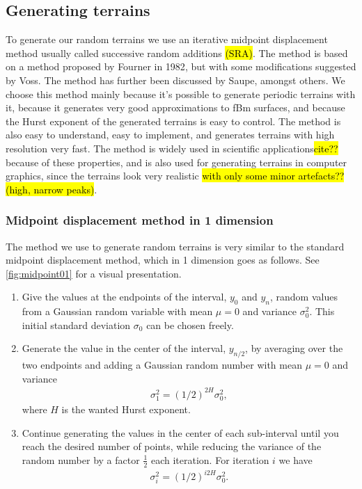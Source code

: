 \subsection{Generating terrains}

To generate our random terrains we use an iterative midpoint displacement method usually called successive random additions \hl{(SRA)}. The method is based on a method proposed by Fourner in 1982\cite{fournier1982computer}, but with some modifications suggested by Voss\cite{voss1985random, voss1988fractals}. The method has further been discussed by Saupe\cite{saupe1988algorithms}, amongst others. We choose this method mainly because it's possible to generate periodic terrains with it, because it generates very good approximations to fBm surfaces\cite{zhou2005comparison}, and because the Hurst exponent of the generated terrains is easy to control. The method is also easy to understand, easy to implement, and generates terrains with high resolution very fast. The method is widely used in scientific applications\hl{cite??} because of these properties, and is also used for generating terrains in computer graphics, since the terrains look very realistic \hl{with only some minor artefacts?? (high, narrow peaks)}.

\subsubsection{Midpoint displacement method in 1 dimension}
The method we use to generate random terrains is very similar to the standard midpoint displacement method, which in 1 dimension goes as follows. See \cref{fig:midpoint01} for a visual presentation.
\begin{enumerate}
    \item Give the values at the endpoints of the interval, $y_0$ and $y_n$, random values from a Gaussian random variable with mean $\mu = 0$ and variance $\sigma_0^2$. This initial standard deviation $\sigma_0$ can be chosen freely.
    \item Generate the value in the center of the interval, $y_{n/2}$, by averaging over the two endpoints and adding a Gaussian random number with mean $\mu = 0$ and variance
    \begin{align*}
         \sigma_1^2 = \left(1/2\right)^{2H}\sigma_0^2,
    \end{align*}
    where $H$ is the wanted Hurst exponent.
    \item Continue generating the values in the center of each sub-interval until you reach the desired number of points, while reducing the variance of the random number by a factor $\frac{1}{2}$ each iteration. For iteration $i$ we have
    \begin{align*}
        \sigma_i^2 = \left(1/2\right)^{i2H}\sigma_0^2.
    \end{align*}
\end{enumerate}

